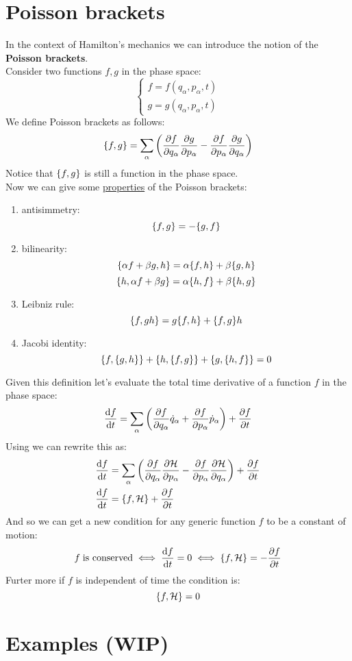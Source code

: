 \section{Poisson brackets}
In the context of Hamilton's mechanics we can introduce the notion of the \textbf{Poisson brackets}.\\
Consider two functions $f,g$ in the phase space:
\begin{equation}
    \begin{cases}
        f = f(q_{\alpha},p_{\alpha},t)\\
        g = g(q_{\alpha},p_{\alpha},t)
    \end{cases}
\end{equation}
We define Poisson brackets as follows:
\begin{equation}
    \pb{f}{g} = \bigsum_{\alpha}\brackets{\pdv{f}{q_{\alpha}}\pdv{g}{p_\alpha} - \pdv{f}{p_{\alpha}}\pdv{g}{q_{\alpha}}}
\end{equation}
Notice that $\pb{f}{g}$ is still a function in the phase space.\\
Now we can give some \underline{properties} of the Poisson brackets:
\begin{enumerate}
    \item antisimmetry: \[\pb{f}{g} = - \pb{g}{f}\]
    \item bilinearity:
    \[\pb{\alpha f + \beta g}{h} = \alpha\pb{f}{h}+ \beta\pb{g}{h}\]
    \[\pb{h}{\alpha f + \beta g} = \alpha\pb{h}{f}+ \beta\pb{h}{g}\]
    \item Leibniz rule: \[\pb{f}{gh} = g\pb{f}{h} + \pb{f}{g}h\]
    \item Jacobi identity: \[\pb{f}{\pb{g}{h}} + \pb{h}{\pb{f}{g}} + \pb{g}{\pb{h}{f}} = 0\]
\end{enumerate}
Given this definition let's evaluate the total time derivative of a function $f$ in the phase space:
\begin{equation}
    \dv{f}{t} = \bigsum_{\alpha}\brackets{\pdv{f}{q_{\alpha}}\dot{q}_{\alpha} + \pdv{f}{p_{\alpha}}\dot{p}_{\alpha}} + \pdv{f}{t}
\end{equation}
Using \hamiltonref\;we can rewrite this as:
\begin{equation}
    \begin{split}
        \dv{f}{t} &= \bigsum_{\alpha}\brackets{\pdv{f}{q_{\alpha}}\pdv{\hamfun}{p_{\alpha}} - \pdv{f}{p_{\alpha}}\pdv{\hamfun}{q_{\alpha}}} + \pdv{f}{t}\\
        \dv{f}{t} &= \pb{f}{\hamfun} + \pdv{f}{t}
    \end{split}
\end{equation}
And so we can get a new condition for any generic function $f$ to be a constant of motion:
\begin{equation}
    f\;\text{is conserved} \iff \dv{f}{t} = 0 \iff \pb{f}{\hamfun} = -\pdv{f}{t}
\end{equation}
Furter more if $f$ is independent of time the condition is:
\begin{equation}
    \pb{f}{\hamfun} = 0
\end{equation}
\section{Examples (WIP)}
